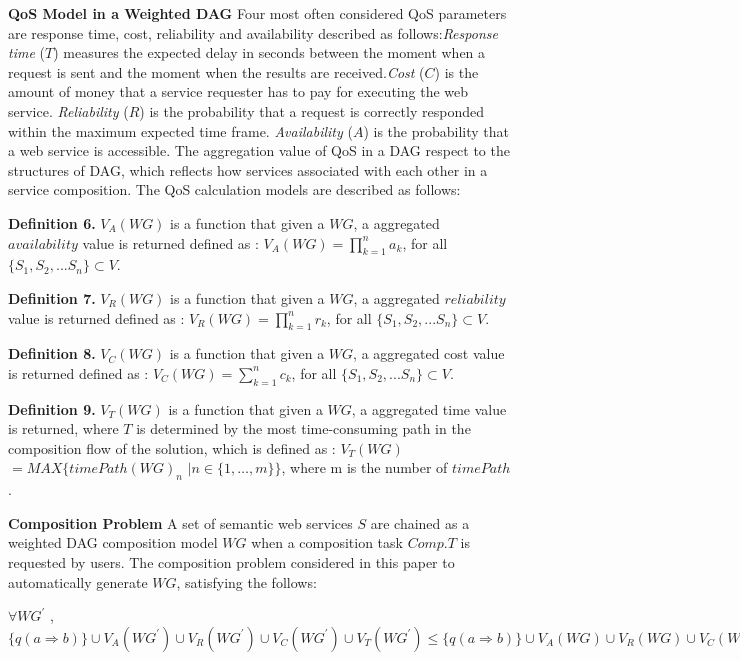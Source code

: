 \documentclass{llncs}
\begin{document}
\textbf{QoS Model in a Weighted DAG}
Four most often considered QoS parameters \cite{zeng2003quality} are response time, cost, reliability and availability described as follows:\textit{Response time} ($T$) measures the expected delay in seconds between the moment when a request is sent and the moment when the results are received.\textit{Cost} ($C$) is the amount of money that a service requester has to pay for executing the web service. \textit{Reliability} ($R$) is the probability that a request is correctly responded within the maximum expected time frame. \textit{Availability} ($A$) is the probability that a web service is accessible. The aggregation value of QoS in a DAG respect to the structures of DAG, which reflects how services associated with each other in a service composition. The QoS calculation models are described as follows:


\textbf{Definition 6.} $V_{A}(WG)$ is a function that given a $WG$, a aggregated $availability$ value is returned defined as :
$V_{A}(WG)=\prod\limits^n_{k=1}a_k$, for all $\{S_1, S_2, ... S_n\} \subset V$.

\textbf{Definition 7.} $V_{R}(WG)$ is a function that given a $WG$, a aggregated $reliability$ value is returned defined as :
$V_{R}(WG)=\prod\limits^n_{k=1}r_k$, for all $\{S_1, S_2, ... S_n\} \subset V$.

\textbf{Definition 8.} $V_{C}(WG)$ is a function that given a $WG$, a aggregated cost value is returned defined as :
$V_{C}(WG)=\sum\limits^n_{k=1}c_k$, for all $\{S_1, S_2, ... S_n\} \subset V$.


\textbf{Definition 9.} $V_{T}(WG)$ is a function that given a $WG$, a aggregated time value is returned, where  $T$ is determined by the most time-consuming path in the composition flow of the solution, which is defined as :
$V_{T}(WG)$ $=MAX\{timePath(WG)_n$ $|n\in\{1,\ldots,m\}\}$, where m is the number of $timePath$.

\vspace{0.5cm}

\textbf{Composition Problem}
A set of semantic web services $S$ are chained as a weighted DAG composition model $WG$ when a composition task $Comp.T$ is requested by users. The composition problem considered in this paper to automatically generate $WG$, satisfying the follows:

$\forall WG^{'}$ , $\{q(a \Rightarrow b) \} \cup V_{A}(WG^{'}) \cup V_{R}(WG^{'}) \cup V_{C}(WG^{'}) \cup V_{T}(WG^{'})  \leq \{ q(a \Rightarrow b) \} \cup V_{A}(WG) \cup V_{R}(WG) \cup V_{C}(WG) \cup V_{T}(WG) $ 
\end{document}

